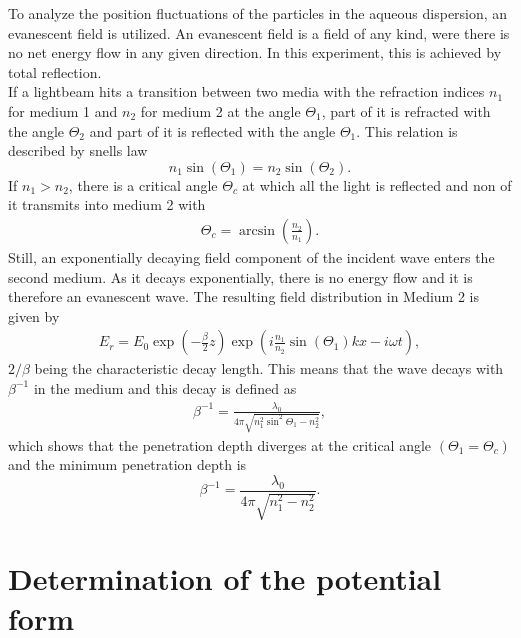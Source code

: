 \documentclass[.../bericht]{subfilies}
\begin{document}
        To analyze the position fluctuations of the particles in the aqueous dispersion, an evanescent field is utilized. An evanescent field is a field of any kind, were there is no net energy flow in any given direction. In this experiment, this is achieved by total reflection. \\
        If  a lightbeam hits a transition between two media with the refraction indices $n_1$ for medium 1 and $n_2$ for medium 2 at the angle $\Theta_1$, part of it is refracted with the angle $\Theta_2$ and part of it is reflected with the angle $\Theta_1$. This relation is described by snells law
        \begin{equation*}
          n_1 \sin(\Theta_1)=n_2 \sin(\Theta_2).
        \end{equation*}
        If $n_1>n_2$, there is a critical angle $\Theta_c$ at which all the light is reflected and non of it transmits into medium 2 with
        \begin{align*}
          \Theta_c=\arcsin\left(\frac{n_2}{n_1}\right).
        \end{align*}
        Still, an exponentially decaying field component of the incident wave enters the second medium. As it decays exponentially, there is no energy flow and it is therefore an evanescent wave. The resulting field distribution in Medium 2 is given by
        \begin{align*}
          E_r=E_0 \exp\left( -\frac{\beta}{2}z \right) \exp\left( i\frac{n_1}{n_2}\sin(\Theta_1)kx-i\omega t \right),
        \end{align*}
        $2/\beta$ being the characteristic decay length. This means that the wave decays with $\beta^{-1}$ in the medium and this decay is defined as
        \begin{align*}
          \beta^{-1}=\frac{\lambda_0}{4 \pi \sqrt{n_1^2 \sin^2\Theta_1-n_2^2}},
        \end{align*}
        which shows that the penetration depth diverges at the critical angle $(\Theta_1=\Theta_c)$ and the minimum penetration depth is
        \begin{equation*}
          \beta^{-1}=\frac{\lambda_0}{4 \pi \sqrt{n_1^2-n_2^2}}.
        \end{equation*}


      \section{Determination of the potential form}
      \label{sec:determination}
\end{document}
